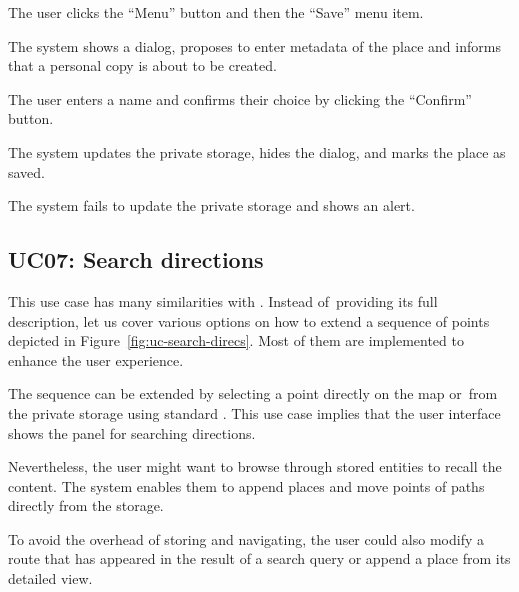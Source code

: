
\begin{ucenumerate}
\item The user clicks the ``Menu'' button and then the ``Save'' menu item.
\item The system shows a dialog, proposes to enter metadata of the place and informs that a personal copy is about to be created.
\item The user enters a name and confirms their choice by clicking the ``Confirm'' button.
\end{ucenumerate}


\begin{ucitemize}
\item The system updates the private storage, hides the dialog, and marks the place as saved.
\end{ucitemize}


\begin{ucitemize}
\item The system fails to update the private storage and shows an alert.
\end{ucitemize}

\subsection{UC07: Search directions}\label{sssec:uc-search-direcs}

This use case has many similarities with \emph{}. Instead of~pro\-viding its full description, let us cover various options on how to extend a sequence of points depicted in Figure~\ref{fig:uc-search-direcs}. Most of them are implemented to enhance the user experience.

The sequence can be extended by selecting a point directly on the map or~from the private storage using standard \emph{}. This use case implies that the user interface shows the panel for searching directions.

Nevertheless, the user might want to browse through stored entities to recall the content. The system enables them to append places and move points of paths directly from the storage.

To avoid the overhead of storing and navigating, the user could also modify a route that has appeared in the result of a search query or append a place from its detailed view.

